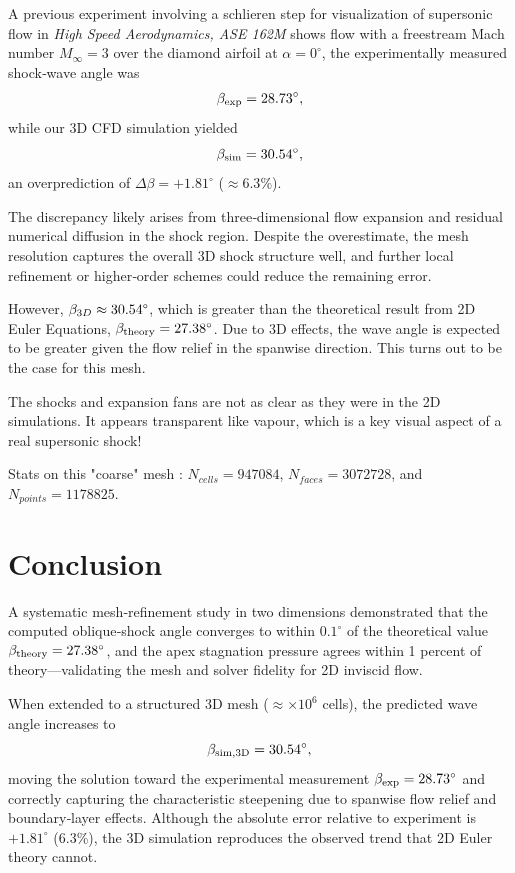 \documentclass[11pt]{article}
\begin{document}
A previous experiment involving a schlieren step for visualization of supersonic flow in \textit{High Speed Aerodynamics, ASE 162M} shows flow with a freestream Mach number \(M_\infty = 3\) over the diamond airfoil at \(\alpha=0^\circ\), the experimentally measured shock‐wave angle was
\[
\beta_{\rm exp} = 28.73^\circ,
\]
while our 3D CFD simulation yielded
\[
\beta_{\rm sim} = 30.54^\circ,
\]
an overprediction of \(\Delta\beta = +1.81^\circ\) (\(\approx6.3\%\)). 

The discrepancy likely arises from three‐dimensional flow expansion and residual numerical diffusion in the shock region.  Despite the overestimate, the mesh resolution captures the overall 3D shock structure well, and further local refinement or higher‐order schemes could reduce the remaining error. 

However, $\beta_{3D} \approx 30.54 \degree$, which is greater than the theoretical result from 2D Euler Equations, $\beta_{\rm theory}=27.38^\circ$. Due to 3D effects, the wave angle is expected to be greater given the flow relief in the spanwise direction. This turns out to be the case for this mesh.
\vspace{1.5mm}

The shocks and expansion fans are not as clear as they were in the 2D simulations. It appears transparent like vapour, which is a key visual aspect of a real supersonic shock!
\vspace{1.5mm}

Stats on this "coarse" mesh : $N_{cells} = 947084$, $N_{faces} = 3072728$, and $N_{points} = 1178825$.


\section{Conclusion}

A systematic mesh‐refinement study in two dimensions demonstrated that the computed oblique‐shock angle converges to within $0.1^\circ$ of the theoretical value $\beta_{\rm theory}=27.38^\circ$, and the apex stagnation pressure agrees within 1 percent of theory—validating the mesh and solver fidelity for 2D inviscid flow.

When extended to a structured 3D mesh ($\approx \times 10^6$ cells), the predicted wave angle increases to
\[
  \beta_{\rm sim,3D} = 30.54^\circ,
\]
moving the solution toward the experimental measurement $\beta_{\rm exp}=28.73^\circ$ and correctly capturing the characteristic steepening due to spanwise flow relief and boundary‐layer effects. Although the absolute error relative to experiment is $+1.81^\circ$ (6.3\%), the 3D simulation reproduces the observed trend that 2D Euler theory cannot.
\end{document}
